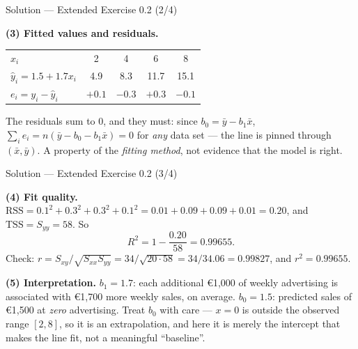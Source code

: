\documentclass[aspectratio=169,11pt]{beamer}
\begin{document}
\begin{frame}{Solution --- Extended Exercise 0.2 (2/4)}
  \begin{solutionbox}
    \textbf{(3) Fitted values and residuals.}
    \begin{center}\scriptsize
    \begin{tabular}{@{}lcccc@{}}
      \toprule
      $x_i$ & 2 & 4 & 6 & 8 \\
      $\hat y_i = 1.5+1.7x_i$ & 4.9 & 8.3 & 11.7 & 15.1 \\
      $e_i = y_i - \hat y_i$ & $+0.1$ & $-0.3$ & $+0.3$ & $-0.1$ \\
      \bottomrule
    \end{tabular}
    \end{center}
    The residuals sum to $0$, and they must: since $b_0 = \bar y - b_1\bar x$,
    $\sum_i e_i = n(\bar y - b_0 - b_1 \bar x) = 0$ for \emph{any} data set
    --- the line is pinned through $(\bar x, \bar y)$. A property of the
    \emph{fitting method}, not evidence that the model is right.
  \end{solutionbox}
\end{frame}

\begin{frame}{Solution --- Extended Exercise 0.2 (3/4)}
  \begin{solutionbox}
    \textbf{(4) Fit quality.}
    $\mathrm{RSS} = 0.1^2+0.3^2+0.3^2+0.1^2 = 0.01+0.09+0.09+0.01 = 0.20$,
    and $\mathrm{TSS} = S_{yy} = 58$. So
    \[
      R^2 = 1 - \frac{0.20}{58} = 0.99655 .
    \]
    Check: $r = S_{xy}/\sqrt{S_{xx}S_{yy}} = 34/\sqrt{20 \cdot 58}
    = 34/34.06 = 0.99827$, and $r^2 = 0.99655$. \checkmark

    \textbf{(5) Interpretation.} $b_1 = 1.7$: each additional
    \euro 1{,}000 of weekly advertising is associated with \euro 1{,}700 more
    weekly sales, on average. $b_0 = 1.5$: predicted sales of \euro 1{,}500
    at \emph{zero} advertising. Treat $b_0$ with care --- $x = 0$ is outside
    the observed range $[2,8]$, so it is an extrapolation, and here it is
    merely the intercept that makes the line fit, not a meaningful
    ``baseline''.
  \end{solutionbox}
\end{frame}
\end{document}
